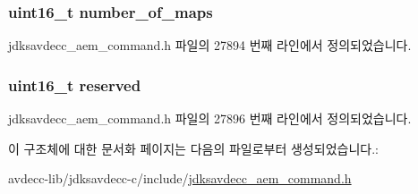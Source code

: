 \subsubsection[{\texorpdfstring{number\+\_\+of\+\_\+maps}{number_of_maps}}]{\setlength{\rightskip}{0pt plus 5cm}uint16\+\_\+t number\+\_\+of\+\_\+maps}\hypertarget{structjdksavdecc__aem__command__get__audio__map__response_a6d00316ed943197ab46c0af22c1d430a}{}\label{structjdksavdecc__aem__command__get__audio__map__response_a6d00316ed943197ab46c0af22c1d430a}


jdksavdecc\+\_\+aem\+\_\+command.\+h 파일의 27894 번째 라인에서 정의되었습니다.

\subsubsection[{\texorpdfstring{reserved}{reserved}}]{\setlength{\rightskip}{0pt plus 5cm}uint16\+\_\+t reserved}\hypertarget{structjdksavdecc__aem__command__get__audio__map__response_a5a6ed8c04a3db86066924b1a1bf4dad3}{}\label{structjdksavdecc__aem__command__get__audio__map__response_a5a6ed8c04a3db86066924b1a1bf4dad3}


jdksavdecc\+\_\+aem\+\_\+command.\+h 파일의 27896 번째 라인에서 정의되었습니다.



이 구조체에 대한 문서화 페이지는 다음의 파일로부터 생성되었습니다.\+:\begin{DoxyCompactItemize}
\item 
avdecc-\/lib/jdksavdecc-\/c/include/\hyperlink{jdksavdecc__aem__command_8h}{jdksavdecc\+\_\+aem\+\_\+command.\+h}\end{DoxyCompactItemize}
